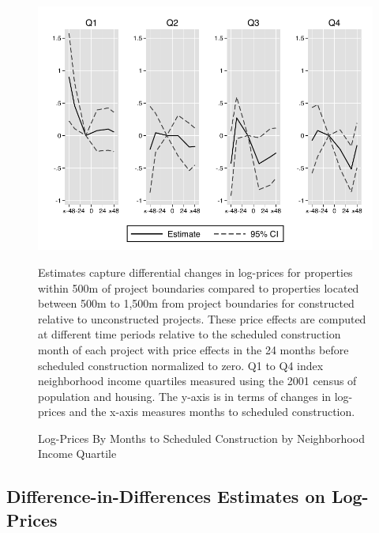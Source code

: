 \documentclass[12pt]{article}
\begin{document}
\begin{figure}[!htb]
      {  \centering
   \caption[ Log-Prices By Months to Scheduled Construction by Neighborhood Income Quartile ]
    {\small Log-Prices By Months to Scheduled Construction by Neighborhood Income Quartile }\label{figure:pricesovertimehet} 
\includegraphics[width=\textwidth,trim={0.3cm .3cm 0.1cm 0cm}, clip=true]{figures/price_time_3d_ctrl_q_comb.pdf}
}
Estimates capture differential changes in log-prices for properties within 500m of project boundaries compared to properties located between 500m to 1,500m from project boundaries for constructed relative to unconstructed projects.  These price effects are computed at different time periods relative to the scheduled construction month of each project with price effects in the 24 months before scheduled construction normalized to zero.  Q1 to Q4 index neighborhood income quartiles measured using the 2001 census of population and housing.  The y-axis is in terms of changes in log-prices and the x-axis measures months to scheduled construction.
\end{figure}



\subsection{Difference-in-Differences Estimates on Log-Prices}\label{section:appendixpricedd}
\end{document}
